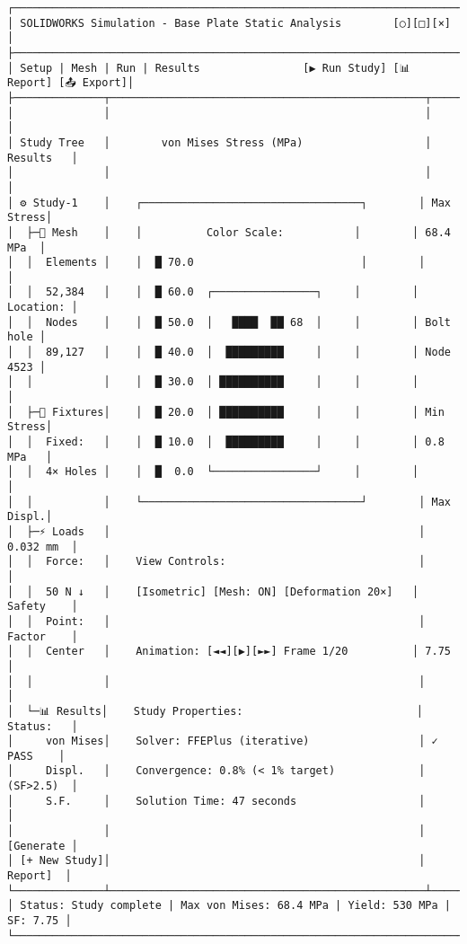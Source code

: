 \documentclass[
]{article}
\begin{document}
\begin{verbatim}
┌────────────────────────────────────────────────────────────────────────────┐
│ SOLIDWORKS Simulation - Base Plate Static Analysis        [○][□][×]        │
├────────────────────────────────────────────────────────────────────────────┤
│ Setup | Mesh | Run | Results                [▶ Run Study] [📊 Report] [📤 Export]│
├──────────────┬─────────────────────────────────────────────────┬───────────┤
│              │                                                 │           │
│ Study Tree   │        von Mises Stress (MPa)                   │ Results   │
│              │                                                 │           │
│ ⚙ Study-1    │    ┌──────────────────────────────────┐        │ Max Stress│
│  ├─📐 Mesh    │    │          Color Scale:           │        │ 68.4 MPa  │
│  │  Elements │    │  █ 70.0                          │        │           │
│  │  52,384   │    │  █ 60.0  ┌────────────────┐     │        │ Location: │
│  │  Nodes    │    │  █ 50.0  │   ████  ██ 68  │     │        │ Bolt hole │
│  │  89,127   │    │  █ 40.0  │  █████████     │     │        │ Node 4523 │
│  │           │    │  █ 30.0  │ ██████████     │     │        │           │
│  ├─🔧 Fixtures│    │  █ 20.0  │ ██████████     │     │        │ Min Stress│
│  │  Fixed:   │    │  █ 10.0  │  █████████     │     │        │ 0.8 MPa   │
│  │  4× Holes │    │  █  0.0  └────────────────┘     │        │           │
│  │           │    └──────────────────────────────────┘        │ Max Displ.│
│  ├─⚡ Loads   │                                                │ 0.032 mm  │
│  │  Force:   │    View Controls:                              │           │
│  │  50 N ↓   │    [Isometric] [Mesh: ON] [Deformation 20×]   │ Safety    │
│  │  Point:   │                                                │ Factor    │
│  │  Center   │    Animation: [◄◄][▶][►►] Frame 1/20          │ 7.75      │
│  │           │                                                │           │
│  └─📊 Results│    Study Properties:                           │ Status:   │
│     von Mises│    Solver: FFEPlus (iterative)                 │ ✓ PASS    │
│     Displ.   │    Convergence: 0.8% (< 1% target)             │ (SF>2.5)  │
│     S.F.     │    Solution Time: 47 seconds                   │           │
│              │                                                │ [Generate │
│ [+ New Study]│                                                │  Report]  │
└──────────────┴─────────────────────────────────────────────────┴───────────┘
│ Status: Study complete | Max von Mises: 68.4 MPa | Yield: 530 MPa | SF: 7.75 │
└────────────────────────────────────────────────────────────────────────────┘
\end{verbatim}
\end{document}
